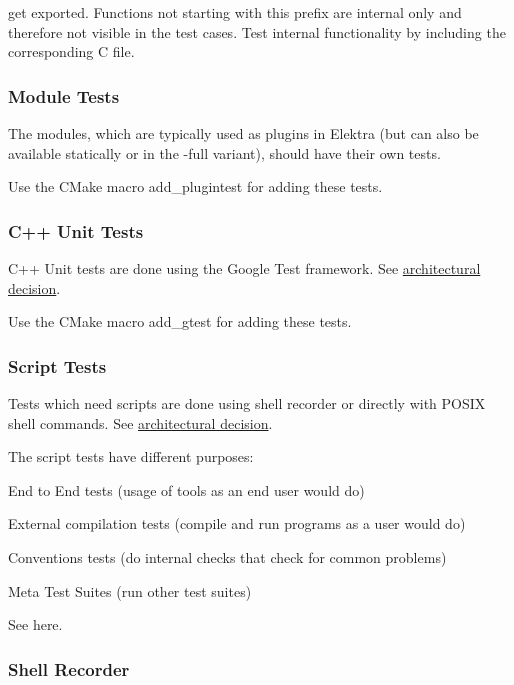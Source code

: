 get exported. Functions not starting with this prefix are internal only and therefore not visible in the test cases. Test internal functionality by including the corresponding C file.

\subsubsection*{Module Tests}

The modules, which are typically used as plugins in Elektra (but can also be available statically or in the {\ttfamily -\/full} variant), should have their own tests.

Use the C\+Make macro {\ttfamily add\+\_\+plugintest} for adding these tests.

\subsubsection*{C++ Unit Tests}

C++ Unit tests are done using the Google Test framework. See \hyperlink{doc_decisions_unit_testing_md}{architectural decision}.

Use the C\+Make macro {\ttfamily add\+\_\+gtest} for adding these tests.

\subsubsection*{Script Tests}

Tests which need scripts are done using shell recorder or directly with P\+O\+S\+IX shell commands. See \hyperlink{doc_decisions_script_testing_md}{architectural decision}.

The script tests have different purposes\+:


\begin{DoxyItemize}
\item End to End tests (usage of tools as an end user would do)
\item External compilation tests (compile and run programs as a user would do)
\item Conventions tests (do internal checks that check for common problems)
\item Meta Test Suites (run other test suites)
\end{DoxyItemize}

See here.

\subsubsection*{Shell Recorder}

